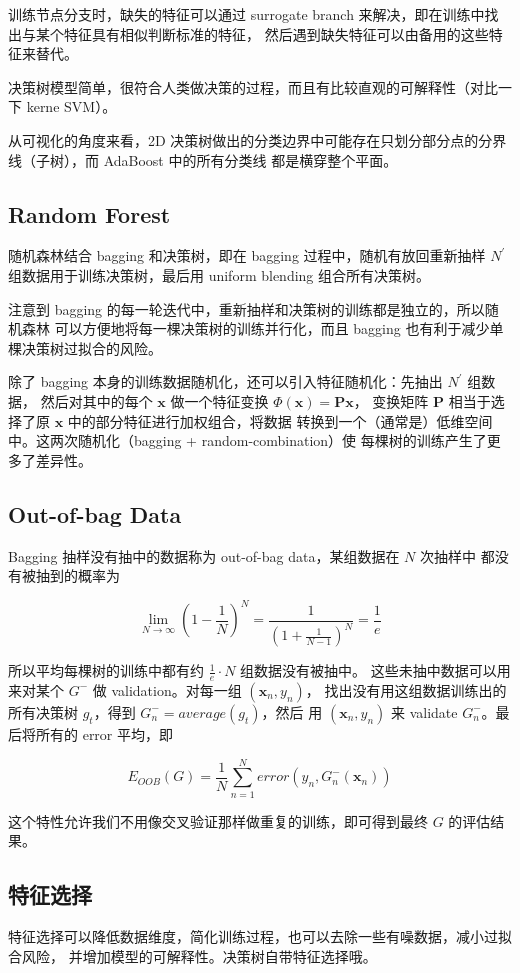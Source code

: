 \documentclass[a4paper]{article}
\begin{document}
训练节点分支时，缺失的特征可以通过 surrogate branch 来解决，即在训练中找出与某个特征具有相似判断标准的特征，
然后遇到缺失特征可以由备用的这些特征来替代。

决策树模型简单，很符合人类做决策的过程，而且有比较直观的可解释性（对比一下 kerne SVM）。

从可视化的角度来看，2D 决策树做出的分类边界中可能存在只划分部分点的分界线（子树），而 AdaBoost 中的所有分类线
都是横穿整个平面。


\subsection{Random Forest}
随机森林结合 bagging 和决策树，即在 bagging 过程中，随机有放回重新抽样 $N^{\prime}$
组数据用于训练决策树，最后用 uniform blending 组合所有决策树。

注意到 bagging 的每一轮迭代中，重新抽样和决策树的训练都是独立的，所以随机森林
可以方便地将每一棵决策树的训练并行化，而且 bagging 也有利于减少单棵决策树过拟合的风险。

除了 bagging 本身的训练数据随机化，还可以引入特征随机化：先抽出 $N^{\prime}$ 组数据，
然后对其中的每个 $\mathbf{x}$ 做一个特征变换 $\Phi(\mathbf{x}) = \mathbf{Px}$，
变换矩阵 $\mathbf{P}$ 相当于选择了原 $\mathbf{x}$ 中的部分特征进行加权组合，将数据
转换到一个（通常是）低维空间中。这两次随机化（bagging + random-combination）使
每棵树的训练产生了更多了差异性。

\subsection{Out-of-bag Data}
Bagging 抽样没有抽中的数据称为 out-of-bag data，某组数据在 $N$ 次抽样中
都没有被抽到的概率为

$$\lim_{N \to \infty}\left ( 1 - \frac{1}{N} \right )^N = \frac{1}{\left ( 1 + \frac{1}{N-1} \right )^N} = \frac{1}{e}$$

所以平均每棵树的训练中都有约 $\displaystyle \frac{1}{e}\cdot N$ 组数据没有被抽中。
这些未抽中数据可以用来对某个 $G^{-}$ 做 validation。对每一组 $(\mathbf{x}_n, y_n)$，
找出没有用这组数据训练出的所有决策树 $g_t$，得到 $G_n^{-} = average(g_t)$，然后
用 $(\mathbf{x}_n, y_n)$ 来 validate $G_n^{-}$。最后将所有的 error 平均，即

$$E_{OOB}(G) = \frac{1}{N}\sum_{n=1}^{N}error(y_n, G_n^{-}(\mathbf{x}_n))$$

这个特性允许我们不用像交叉验证那样做重复的训练，即可得到最终 $G$ 的评估结果。

\subsection{特征选择}
特征选择可以降低数据维度，简化训练过程，也可以去除一些有噪数据，减小过拟合风险，
并增加模型的可解释性。决策树自带特征选择哦。
\end{document}
